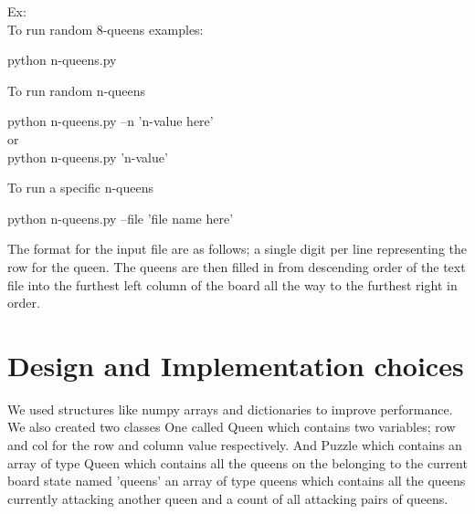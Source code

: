 \documentclass{article}
\begin{document}
Ex:
\\
To run random 8-queens examples: 
\begin{center}
python n-queens.py
\end{center}
To run random n-queens
\begin{center}
python n-queens.py --n 'n-value here'\\
or\\
python n-queens.py 'n-value'
\end{center}
To run a specific n-queens
\begin{center}
python n-queens.py --file 'file name here'
\end{center}
The format for the input file are as follows; a single digit per line representing the row for the queen. The queens are then filled in from descending order of the text file into the furthest left column of the board all the way to the furthest right in order. 

\section{Design and Implementation choices}
 We used structures like numpy arrays and dictionaries to improve performance. We also created two classes One called Queen which contains two variables; row and col for the row and column value respectively. And Puzzle which contains an array of type Queen which contains all the queens on the belonging to the current board state named 'queens' an array of type queens which contains all the queens currently attacking another queen and a count of all attacking pairs of queens.\\
 \newpage
\end{document}
